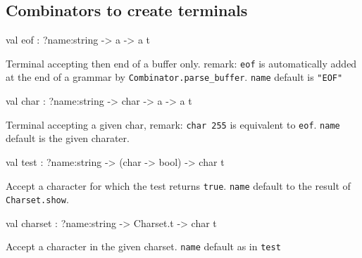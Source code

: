 \documentclass[11pt]{article}
\begin{document}
\subsection{Combinators to create terminals}




\label{val:Lex.eof}\begin{ocamldoccode}
val eof : ?name:string -> {\textquotesingle}a -> {\textquotesingle}a t
\end{ocamldoccode}
\begin{ocamldocdescription}
Terminal accepting then end of a buffer only.
    remark: {\tt{eof}} is automatically added at the end of a grammar by
    {\tt{Combinator.parse\_buffer}}.
    {\tt{name}} default is {\tt{"EOF"}}


\end{ocamldocdescription}




\label{val:Lex.char}\begin{ocamldoccode}
val char : ?name:string -> char -> {\textquotesingle}a -> {\textquotesingle}a t
\end{ocamldoccode}
\begin{ocamldocdescription}
Terminal accepting a given char, remark: {\tt{char {\textquotesingle}{}255{\textquotesingle}}} is equivalent to
    {\tt{eof}}. {\tt{name}} default is the given charater.


\end{ocamldocdescription}




\label{val:Lex.test}\begin{ocamldoccode}
val test : ?name:string -> (char -> bool) -> char t
\end{ocamldoccode}
\begin{ocamldocdescription}
Accept a character for which the test returns {\tt{true}}. {\tt{name}} default
    to the result of {\tt{Charset.show}}.


\end{ocamldocdescription}




\label{val:Lex.charset}\begin{ocamldoccode}
val charset : ?name:string -> Charset.t -> char t
\end{ocamldoccode}
\begin{ocamldocdescription}
Accept a character in the given charset. {\tt{name}} default as in {\tt{test}}


\end{ocamldocdescription}
\end{document}
